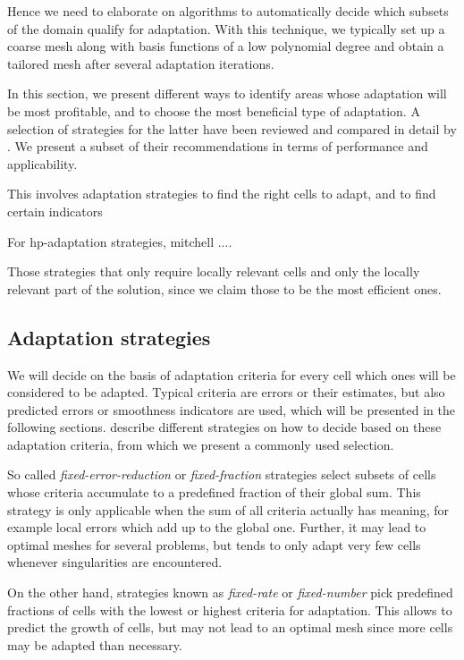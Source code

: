 Hence we need to elaborate on algorithms to automatically decide which subsets of the domain qualify for adaptation. With this technique, we typically set up a coarse mesh along with basis functions of a low polynomial degree and obtain a tailored mesh after several adaptation iterations.

In this section, we present different ways to identify areas whose adaptation will be most profitable, and to choose the most beneficial type of adaptation. A selection of strategies for the latter have been reviewed and compared in detail by \textcite{mitchell2014}. We present a subset of their recommendations in terms of performance and applicability.


This involves adaptation strategies to find the right cells to adapt, and to find certain indicators

For hp-adaptation strategies, mitchell ....

Those strategies that only require locally relevant cells and only the locally relevant part of the solution, since we claim those to be the most efficient ones.



\subsection{Adaptation strategies}
\label{ssec:strategy}

We will decide on the basis of adaptation criteria for every cell which ones will be considered to be adapted. Typical criteria are errors or their estimates, but also predicted errors or smoothness indicators are used, which will be presented in the following sections. \textcite[Sec.~5.2]{bangerth2003} describe different strategies on how to decide based on these adaptation criteria, from which we present a commonly used selection.

So called \textit{fixed-error-reduction} or \textit{fixed-fraction} strategies select subsets of cells whose criteria accumulate to a predefined fraction of their global sum. This strategy is only applicable when the sum of all criteria actually has meaning, for example local errors which add up to the global one. Further, it may lead to optimal meshes for several problems, but tends to only adapt very few cells whenever singularities are encountered.

On the other hand, strategies known as \textit{fixed-rate} or \textit{fixed-number} pick predefined fractions of cells with the lowest or highest criteria for adaptation. This allows to predict the growth of cells, but may not lead to an optimal mesh since more cells may be adapted than necessary.


